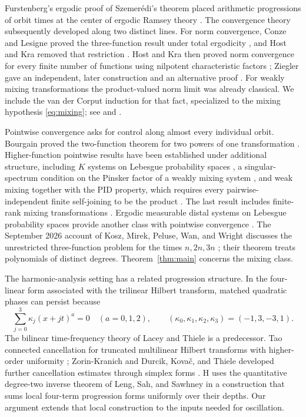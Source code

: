 Furstenberg's ergodic proof of Szemer\'edi's theorem placed arithmetic
progressions of orbit times at the center of ergodic Ramsey theory
\cite[Theorem~1.4]{Furstenberg1977}.  The convergence theory subsequently
developed along two distinct lines.  For norm convergence, Conze and Lesigne
proved the three-function result under total ergodicity
\cite{ConzeLesigne1987}, and Host and Kra removed that restriction
\cite{HostKra2001}.  Host and Kra then proved norm convergence for every
finite number of functions using nilpotent characteristic factors
\cite[Theorem~1.1]{HostKra2005}; Ziegler gave an independent, later
construction and an alternative proof \cite{Ziegler2007}.  For weakly mixing
transformations the product-valued norm limit was already classical.  We
include the van der Corput induction for that fact, specialized to the
mixing hypothesis \eqref{eq:mixing}; see
\cite[Section~3]{FKO1982} and \cite[Section~3]{Bergelson1987}.

Pointwise convergence asks for control along almost every individual orbit.
Bourgain proved the two-function theorem for two powers of one transformation
\cite{Bourgain1990}.  Higher-function pointwise results have been established
under additional structure, including $K$ systems on Lebesgue probability spaces
\cite[Theorem~4.2]{DerrienLesigne1996}, a singular-spectrum condition on the
Pinsker factor of a weakly mixing system \cite{Assani1998}, and weak mixing
together with the PID property, which requires every pairwise-independent
finite self-joining to be the product \cite{GHSY2018}.
The last result includes finite-rank mixing transformations
\cite{GHSY2018}.  Ergodic measurable distal systems on Lebesgue probability
spaces provide another class with pointwise convergence \cite{HSY2019}.
The September 2026 account of Kosz, Mirek, Peluse, Wan, and Wright
discusses the unrestricted three-function problem for the times $n,2n,3n$
\cite[Section~1.8, item~5]{KMPWW2026}; their theorem treats polynomials of
distinct degrees.  Theorem~\ref{thm:main} concerns the mixing class.

The harmonic-analysis setting has a related progression structure.  In the
four-linear form associated with the trilinear Hilbert transform, matched
quadratic phases can persist because
\[
 \sum_{j=0}^3 \kappa_j(x+jt)^a=0\quad(a=0,1,2),
 \qquad (\kappa_0,\kappa_1,\kappa_2,\kappa_3)=(-1,3,-3,1).
\]
The bilinear time-frequency theory of Lacey and Thiele
\cite{LT1997,LT1999} is a predecessor.  Tao connected cancellation for
truncated multilinear Hilbert transforms with higher-order uniformity
\cite{Tao2015}; Zorin-Kranich and Durcik, Kova\v c, and Thiele developed
further cancellation estimates through simplex forms
\cite{ZK2017,DKT2019}.  H uses the quantitative degree-two inverse theorem
of Leng, Sah, and Sawhney \cite[Theorem~1.2]{LSS2024} in a construction that
sums local four-term progression forms uniformly over their depths.  Our
argument extends that local construction to the inputs needed for oscillation.

